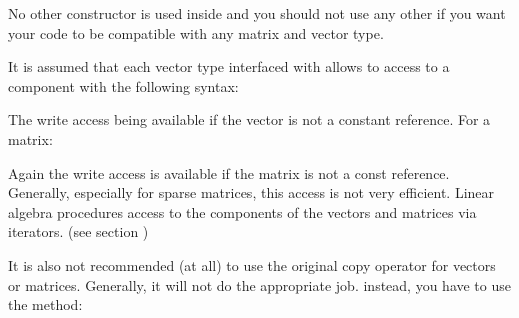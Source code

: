 \documentclass[a4paper,11pt,english]{sphinxmanual}
\begin{document}
\sphinxAtStartPar
No other constructor is used inside  and you should not use any other if you want your code
to be compatible with any matrix and vector type.

\sphinxAtStartPar
It is assumed that each vector type interfaced with  allows to
access to a component with the following syntax:

\begin{sphinxVerbatim}[commandchars=\\\{\}]
  \PYG{p}{[}\PYG{p}{]}    
\PYG{p}{[}\PYG{p}{]}      
\end{sphinxVerbatim}

\sphinxAtStartPar
The write access being available if the vector is not a constant reference. For a matrix:

\begin{sphinxVerbatim}[commandchars=\\\{\}]
    
    
\end{sphinxVerbatim}

\sphinxAtStartPar
Again the write access is available if the matrix is not a const reference. Generally, especially for sparse matrices, this access is not very efficient. Linear algebra procedures access to the components of the vectors and matrices via iterators. (see section  {\hyperref[\detokenize{gmm/inside:gmm-inside}]{}})

\sphinxAtStartPar
It is also not recommended (at all) to use the original copy operator for vectors or matrices. Generally, it will not do the appropriate job. instead, you have to use the method:

\begin{sphinxVerbatim}[commandchars=\\\{\}]
   
\end{sphinxVerbatim}
\end{document}
